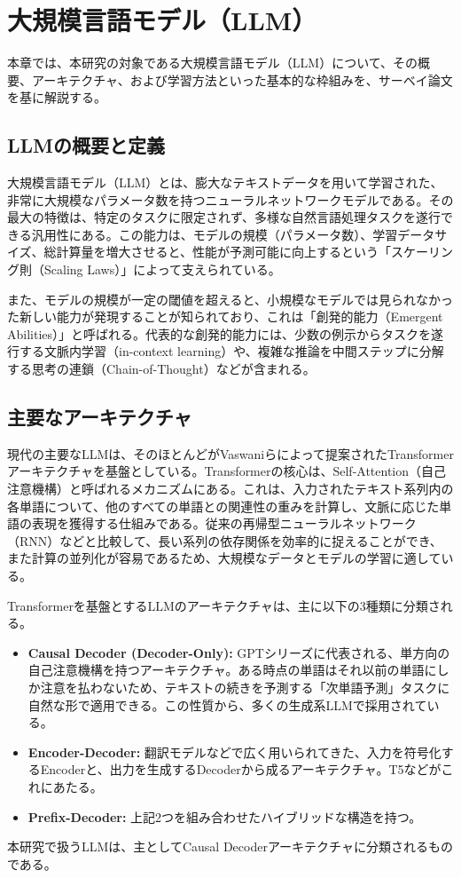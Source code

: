 \documentclass[a4paper,11pt]{jreport}
\begin{document}
\chapter{大規模言語モデル（LLM）}
\label{chap:llm}
本章では、本研究の対象である大規模言語モデル（LLM）について、その概要、アーキテクチャ、および学習方法といった基本的な枠組みを、サーベイ論文\cite{LLMSurvey}を基に解説する。

\section{LLMの概要と定義}
大規模言語モデル（LLM）とは、膨大なテキストデータを用いて学習された、非常に大規模なパラメータ数を持つニューラルネットワークモデルである。その最大の特徴は、特定のタスクに限定されず、多様な自然言語処理タスクを遂行できる汎用性にある\cite{LLMSurvey}。この能力は、モデルの規模（パラメータ数）、学習データサイズ、総計算量を増大させると、性能が予測可能に向上するという「スケーリング則（Scaling Laws）」によって支えられている\cite{LLMSurvey}。

また、モデルの規模が一定の閾値を超えると、小規模なモデルでは見られなかった新しい能力が発現することが知られており、これは「創発的能力（Emergent Abilities）」と呼ばれる\cite{LLMSurvey}。代表的な創発的能力には、少数の例示からタスクを遂行する文脈内学習（in-context learning）や、複雑な推論を中間ステップに分解する思考の連鎖（Chain-of-Thought）などが含まれる。

\section{主要なアーキテクチャ}
現代の主要なLLMは、そのほとんどがVaswaniらによって提案されたTransformerアーキテクチャ\cite{Transformers}を基盤としている。Transformerの核心は、Self-Attention（自己注意機構）と呼ばれるメカニズムにある。これは、入力されたテキスト系列内の各単語について、他のすべての単語との関連性の重みを計算し、文脈に応じた単語の表現を獲得する仕組みである。従来の再帰型ニューラルネットワーク（RNN）などと比較して、長い系列の依存関係を効率的に捉えることができ、また計算の並列化が容易であるため、大規模なデータとモデルの学習に適している\cite{LLMSurvey}。

Transformerを基盤とするLLMのアーキテクチャは、主に以下の3種類に分類される\cite{LLMSurvey}。
\begin{itemize}
    \item \textbf{Causal Decoder (Decoder-Only):} GPTシリーズ\cite{GPT-3}に代表される、単方向の自己注意機構を持つアーキテクチャ。ある時点の単語はそれ以前の単語にしか注意を払わないため、テキストの続きを予測する「次単語予測」タスクに自然な形で適用できる。この性質から、多くの生成系LLMで採用されている。
    \item \textbf{Encoder-Decoder:} 翻訳モデルなどで広く用いられてきた、入力を符号化するEncoderと、出力を生成するDecoderから成るアーキテクチャ。T5\cite{T5}などがこれにあたる。
    \item \textbf{Prefix-Decoder:} 上記2つを組み合わせたハイブリッドな構造を持つ。
\end{itemize}
本研究で扱うLLMは、主としてCausal Decoderアーキテクチャに分類されるものである。
\end{document}
